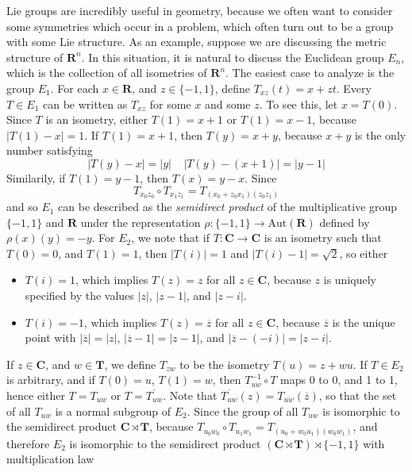 Lie groups are incredibly useful in geometry, because we often want to consider some symmetries which occur in a problem, which often turn out to be a group with some Lie structure. As an example, suppose we are discussing the metric structure of $\mathbf{R}^n$. In this situation, it is natural to discuss the Euclidean group $E_n$, which is the collection of all isometries of $\mathbf{R}^n$. The easiest case to analyze is the group $E_1$. For each $x \in \mathbf{R}$, and $z \in \{ -1, 1 \}$, define $T_{xz}(t) = x + zt$. Every $T \in E_1$ can be written as $T_{xz}$ for some $x$ and some $z$. To see this, let $x = T(0)$. Since $T$ is an isometry, either $T(1) = x + 1$ or $T(1) = x - 1$, because $|T(1) - x| = 1$. If $T(1) = x + 1$, then $T(y) = x + y$, because $x + y$ is the only number satisfying
%
\[ |T(y) - x| = |y|\ \ \ \ \ |T(y) - (x + 1)| = |y - 1|  \]
%
Similarily, if $T(1) = y - 1$, then $T(x) = y - x$. Since
%
\[ T_{x_0z_0} \circ T_{x_1z_1} = T_{(x_0 + z_0x_1)(z_0z_1)} \]
%
and so $E_1$ can be described as the {\it semidirect product} of the multiplicative group $\{ -1, 1 \}$ and $\mathbf{R}$ under the representation $\rho: \{ -1, 1 \} \to \text{Aut}(\mathbf{R})$ defined by $\rho(x)(y) = -y$. For $E_2$, we note that if $T: \mathbf{C} \to \mathbf{C}$ is an isometry such that $T(0) = 0$, and $T(1) = 1$, then $|T(i)| = 1$ and $|T(i) - 1| = \sqrt{2}$, so either
%
\begin{itemize}
    \item $T(i) = 1$, which implies $T(z) = z$ for all $z \in \mathbf{C}$, because $z$ is uniquely specified by the values $|z|$, $|z - 1|$, and $|z - i|$.
    \item $T(i) = -1$, which implies $T(z) = \overline{z}$ for all $z \in \mathbf{C}$, because $\overline{z}$ is the unique point with $|\overline{z}| = |z|$, $|\overline{z} - 1| = |z - 1|$, and $|\overline{z} - (-i)| = |z - i|$.
\end{itemize}
%
If $z \in \mathbf{C}$, and $w \in \mathbf{T}$, we define $T_{zw}$ to be the isometry $T(u) = z + wu$. If $T \in E_2$ is arbitrary, and if $T(0) = u$, $T(1) = w$, then $T_{uw}^{-1} \circ T$ maps 0 to 0, and 1 to 1, hence either $T = T_{uw}$ or $T = \overline{T_{uw}}$. Note that $\overline{T_{uw}}(z) = T_{\overline{uw}}(\overline{z})$, so that the set of all $T_{uw}$ is a normal subgroup of $E_2$. Since the group of all $T_{uw}$ is isomorphic to the semidirect product $\mathbf{C} \rtimes \mathbf{T}$, because $T_{u_0w_0} \circ T_{u_1w_1} = T_{(u_0 + w_0u_1)(w_0w_1)}$, and therefore $E_2$ is isomorphic to the semidirect product $(\mathbf{C} \rtimes \mathbf{T}) \rtimes \{ -1, 1 \}$ with multiplication law
